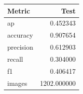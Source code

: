 \begin{tabular}{lr}
\hline
Metric & Test \\
\hline
ap & 0.452343 \\
accuracy & 0.907654 \\
precision & 0.612903 \\
recall & 0.304000 \\
f1 & 0.406417 \\
images & 1202.000000 \\
\hline
\end{tabular}
